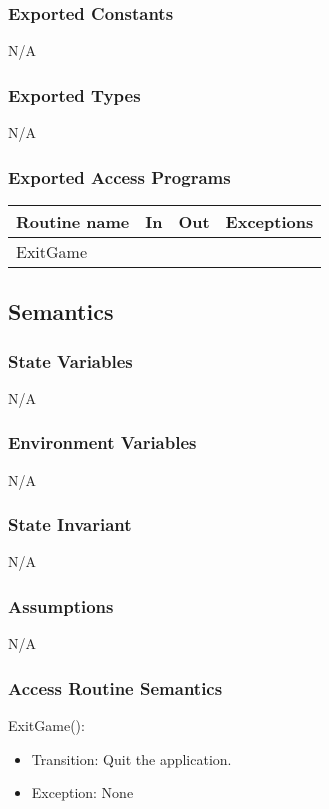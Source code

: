 \documentclass[12pt]{article}
\begin{document}
\subsubsection {Exported Constants}
N/A
\subsubsection {Exported Types}
N/A

\subsubsection {Exported Access Programs}

\begin{tabular}{| l | l | l | l |}
\hline
\textbf{Routine name} & \textbf{In} & \textbf{Out} & \textbf{Exceptions}\\
\hline
ExitGame & & &\\
\hline
\end{tabular}

\subsection {Semantics}

\subsubsection {State Variables}
N/A

\subsubsection {Environment Variables}
N/A

\subsubsection {State Invariant}
N/A

\subsubsection {Assumptions}
N/A

\subsubsection {Access Routine Semantics}

\noindent ExitGame():
\begin{itemize}
    \item Transition: Quit the application.
    \item Exception: None
\end{itemize}
\end{document}
